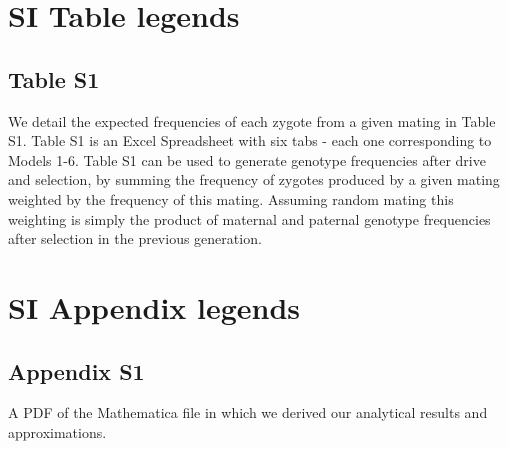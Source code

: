 \documentclass[12pt,letterpaper]{article}
\begin{document}
\section*{SI Table legends}
  \subsection*{Table S1}
  We detail the expected frequencies of each zygote from a given mating in Table S1. 
  Table S1 is an Excel Spreadsheet with six tabs - each one corresponding to Models 1-6. 
  Table S1 can be used to generate genotype frequencies after drive and selection, 
  by summing the  frequency of zygotes produced by a given mating weighted by the frequency of this mating. 
  Assuming random mating this weighting is simply the product of maternal and paternal genotype frequencies after selection in the previous generation. 


\section*{SI Appendix legends}
  \subsection*{Appendix S1}
A PDF of the Mathematica file in which we derived our analytical results and approximations.
\end{document}
